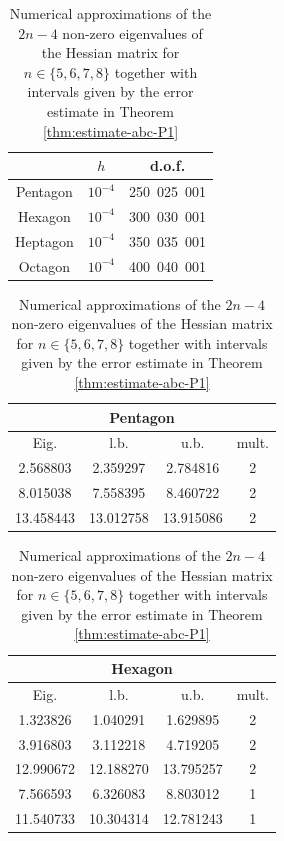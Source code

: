 \documentclass[JEP,XML,SOM,Unicode,ThmDefs,NoFloatCountersInSection,published]{cedram}
\theoremstyle{plain}
\theoremstyle{definition}
\begin{document}
\begin{table}[htb]
\smaller
\caption{Size of the computational problems for the finite element computations.}
\label{table:size-comp}
\begin{tabular}{|c|c|c|}
\hline
& $h$ & d.o.f. \\ \hline
Pentagon & $10^{-4}$ & 250\ 025\ 001\\ \hline
Hexagon & $10^{-4}$ & 300\ 030\ 001\\ \hline
Heptagon & $10^{-4}$ & 350\ 035\ 001\\ \hline
Octagon & $10^{-4}$ & 400\ 040\ 001\\ \hline
\end{tabular}

\vspace*{1.5\baselineskip}
\caption{Numerical approximations of the $2n-4$ non-zero eigenvalues of the Hessian matrix for $n\in \{5,6,7,8\}$ together with intervals given by the error estimate in Theorem \ref{thm:estimate-abc-P1}}
\label{tab:eig-bounds}
\raisebox{12.5pt}
{\begin{minipage}{.49\textwidth}
\begin{tabular}{|c|c|c|c|}
\hline
\multicolumn{4}{|c|}{Pentagon} \\
\hline
Eig. & l.b. & u.b. & mult. \\ \hline
2.568803 & 2.359297 & 2.784816 & 2\\ \hline
8.015038 & 7.558395 & 8.460722 & 2\\ \hline
13.458443 & 13.012758 & 13.915086 & 2\\ \hline
\end{tabular}
\end{minipage}}
\begin{minipage}{.49\textwidth}
\begin{tabular}{|c|c|c|c|}
\hline
\multicolumn{4}{|c|}{Hexagon} \\
\hline
Eig. & l.b. & u.b. & mult. \\ \hline
1.323826 & 1.040291 & 1.629895 & 2\\ \hline
3.916803 & 3.112218 & 4.719205 & 2\\ \hline
12.990672 & 12.188270 & 13.795257 & 2\\ \hline
7.566593 & 6.326083 & 8.803012 & 1 \\ \hline
11.540733 & 10.304314 & 12.781243 & 1 \\ \hline
\end{tabular}
\end{minipage}\par\medskip\noindent

\end{table}
\end{document}
